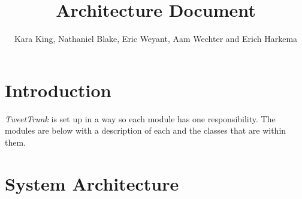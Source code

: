 \documentclass[a4paper, 12pt]{article}
\title{Architecture Document}
\author{Kara King, Nathaniel Blake, Eric Weyant, Aam Wechter and Erich Harkema}
\begin{document}
\maketitle

\section{Introduction} \label{sec:intro}
\begin{adjustwidth}{2em}{0pt}
\textit{TweetTrunk} is set up in a way so each module has one responsibility. The modules are below with a description of each and the classes that are within them. 
\end{adjustwidth}

\tableofcontents

\section{System Architecture} \label{sec:sysarch}
\end{document}
